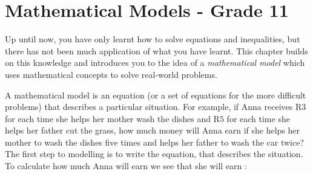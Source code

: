 \chapter{Mathematical Models - Grade 11}
\label{m:se:m11}

Up until now, you have only learnt how to solve equations and inequalities, but there has not been much application of what you have learnt. This chapter builds on this knowledge and introduces you to the idea of a \textit{mathematical model} which uses mathematical concepts to solve real-world problems.



A mathematical model is an equation (or a set of equations for the more difficult problems) that describes a particular situation.
For example, if Anna receives R$3$ for each time she helps her mother wash the dishes and R$5$ for each time she helps her father cut the grass, how much money will Anna earn if she helps her mother to wash the dishes five times and helps her father to wash the car twice?
The first step to modelling is to write the equation, that describes the situation. To calculate how much Anna will earn we see that she will earn :

